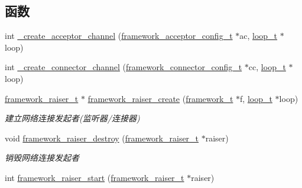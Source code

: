 \subsection*{函数}
\begin{DoxyCompactItemize}
\item 
int \hyperlink{a00058_ae1caed5e3ea73d6e6c98ddf1131310da_ae1caed5e3ea73d6e6c98ddf1131310da}{\+\_\+create\+\_\+acceptor\+\_\+channel} (\hyperlink{a00051_a61a4e424ff4c86631423dedd97c40064_a61a4e424ff4c86631423dedd97c40064}{framework\+\_\+acceptor\+\_\+config\+\_\+t} $\ast$ac, \hyperlink{a00051_a9c3ad1cd2de83e09f3a7b59fa82c94ee_a9c3ad1cd2de83e09f3a7b59fa82c94ee}{loop\+\_\+t} $\ast$loop)
\item 
int \hyperlink{a00058_a27b26fed4e5ce2f25ec573aa736dfe54_a27b26fed4e5ce2f25ec573aa736dfe54}{\+\_\+create\+\_\+connector\+\_\+channel} (\hyperlink{a00051_a81253f4c995b97e69be0e67f7a26097f_a81253f4c995b97e69be0e67f7a26097f}{framework\+\_\+connector\+\_\+config\+\_\+t} $\ast$cc, \hyperlink{a00051_a9c3ad1cd2de83e09f3a7b59fa82c94ee_a9c3ad1cd2de83e09f3a7b59fa82c94ee}{loop\+\_\+t} $\ast$loop)
\item 
\hyperlink{a00051_aa3ac31db191829c9e6db624d660a2563_aa3ac31db191829c9e6db624d660a2563}{framework\+\_\+raiser\+\_\+t} $\ast$ \hyperlink{a00058_a6a305a33afdea0d9b774d4b987aff05e_a6a305a33afdea0d9b774d4b987aff05e}{framework\+\_\+raiser\+\_\+create} (\hyperlink{a00051_a6149d769f6f07ed14a40a271c95d8463_a6149d769f6f07ed14a40a271c95d8463}{framework\+\_\+t} $\ast$f, \hyperlink{a00051_a9c3ad1cd2de83e09f3a7b59fa82c94ee_a9c3ad1cd2de83e09f3a7b59fa82c94ee}{loop\+\_\+t} $\ast$loop)
\begin{DoxyCompactList}\small\item\em 建立网络连接发起者(监听器/连接器) \end{DoxyCompactList}\item 
void \hyperlink{a00058_aeb1e0bff411b59cc3ec79da5ab23d2c1_aeb1e0bff411b59cc3ec79da5ab23d2c1}{framework\+\_\+raiser\+\_\+destroy} (\hyperlink{a00051_aa3ac31db191829c9e6db624d660a2563_aa3ac31db191829c9e6db624d660a2563}{framework\+\_\+raiser\+\_\+t} $\ast$raiser)
\begin{DoxyCompactList}\small\item\em 销毁网络连接发起者 \end{DoxyCompactList}\item 
int \hyperlink{a00058_a72206fc25182b20ead062464ed0b1139_a72206fc25182b20ead062464ed0b1139}{framework\+\_\+raiser\+\_\+start} (\hyperlink{a00051_aa3ac31db191829c9e6db624d660a2563_aa3ac31db191829c9e6db624d660a2563}{framework\+\_\+raiser\+\_\+t} $\ast$raiser)

\end{DoxyCompactItemize}

